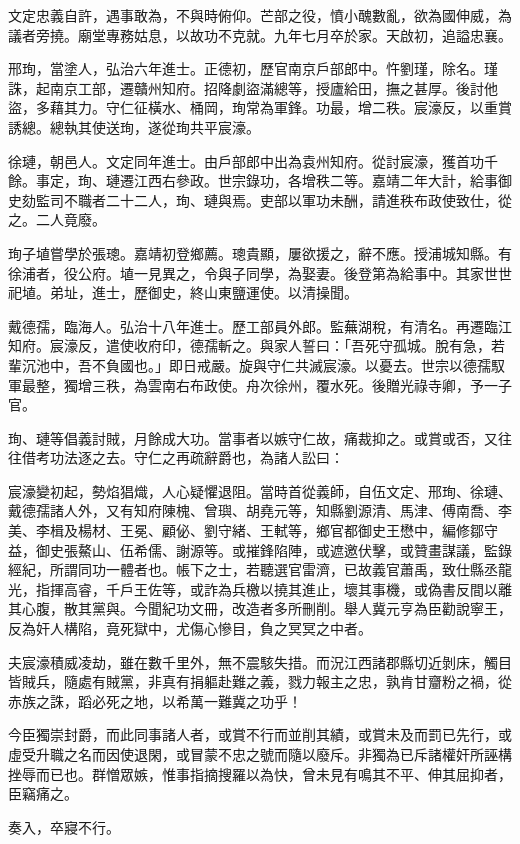 \begin{pinyinscope}
文定忠義自許，遇事敢為，不與時俯仰。芒部之役，憤小醜數亂，欲為國伸威，為議者旁撓。廟堂專務姑息，以故功不克就。九年七月卒於家。天啟初，追謚忠襄。

邢珣，當塗人，弘治六年進士。正德初，歷官南京戶部郎中。忤劉瑾，除名。瑾誅，起南京工部，遷贛州知府。招降劇盜滿總等，授廬給田，撫之甚厚。後討他盜，多藉其力。守仁征橫水、桶岡，珣常為軍鋒。功最，增二秩。宸濠反，以重賞誘總。總執其使送珣，遂從珣共平宸濠。

徐璉，朝邑人。文定同年進士。由戶部郎中出為袁州知府。從討宸濠，獲首功千餘。事定，珣、璉遷江西右參政。世宗錄功，各增秩二等。嘉靖二年大計，給事御史劾監司不職者二十二人，珣、璉與焉。吏部以軍功未酬，請進秩布政使致仕，從之。二人竟廢。

珣子埴嘗學於張璁。嘉靖初登鄉薦。璁貴顯，屢欲援之，辭不應。授浦城知縣。有徐浦者，役公府。埴一見異之，令與子同學，為娶妻。後登第為給事中。其家世世祀埴。弟址，進士，歷御史，終山東鹽運使。以清操聞。

戴德孺，臨海人。弘治十八年進士。歷工部員外郎。監蕪湖稅，有清名。再遷臨江知府。宸濠反，遣使收府印，德孺斬之。與家人誓曰：「吾死守孤城。脫有急，若輩沉池中，吾不負國也。」即日戒嚴。旋與守仁共滅宸濠。以憂去。世宗以德孺馭軍最整，獨增三秩，為雲南右布政使。舟次徐州，覆水死。後贈光祿寺卿，予一子官。

珣、璉等倡義討賊，月餘成大功。當事者以嫉守仁故，痛裁抑之。或賞或否，又往往借考功法逐之去。守仁之再疏辭爵也，為諸人訟曰：

宸濠變初起，勢焰猖熾，人心疑懼退阻。當時首從義師，自伍文定、邢珣、徐璉、戴德孺諸人外，又有知府陳槐、曾璵、胡堯元等，知縣劉源清、馬津、傅南喬、李美、李楫及楊材、王冕、顧佖、劉守緒、王軾等，鄉官都御史王懋中，編修鄒守益，御史張鰲山、伍希儒、謝源等。或摧鋒陷陣，或遮邀伏擊，或贊畫謀議，監錄經紀，所謂同功一體者也。帳下之士，若聽選官雷濟，已故義官蕭禹，致仕縣丞龍光，指揮高睿，千戶王佐等，或詐為兵檄以撓其進止，壞其事機，或偽書反間以離其心腹，散其黨與。今聞紀功文冊，改造者多所刪削。舉人冀元亨為臣勸說寧王，反為奸人構陷，竟死獄中，尤傷心慘目，負之冥冥之中者。

夫宸濠積威凌劫，雖在數千里外，無不震駭失措。而況江西諸郡縣切近剝床，觸目皆賊兵，隨處有賊黨，非真有捐軀赴難之義，戮力報主之忠，孰肯甘齏粉之禍，從赤族之誅，蹈必死之地，以希萬一難冀之功乎！

今臣獨崇封爵，而此同事諸人者，或賞不行而並削其績，或賞未及而罰已先行，或虛受升職之名而因使退閑，或冒蒙不忠之號而隨以廢斥。非獨為已斥諸權奸所誣構挫辱而已也。群憎眾嫉，惟事指摘搜羅以為快，曾未見有鳴其不平、伸其屈抑者，臣竊痛之。

奏入，卒寢不行。


\end{pinyinscope}
